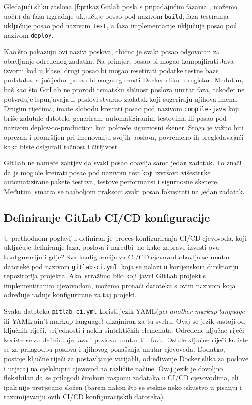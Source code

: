 \documentclass[a4paper,12pt,oneside]{article}
\begin{document}
Gledajući sliku zaslona \ref{f:prikaz Gitlab posla s pripadajućim fazama}, možemo uočiti da faza izgradnje uključuje posao pod nazivom \texttt{build}, faza testiranja uključuje posao pod nazivom \texttt{test}, a faza implementacije uključuje posao pod nazivom \texttt{deploy}.

Kao što pokazuju ovi nazivi poslova, obično je svaki posao odgovoran za obavljanje određenog zadatka. Na primjer, posao bi mogao kompajlirati Java izvorni kod u klase, drugi posao bi mogao resetirati podatke testne baze podataka, a još jedan posao bi mogao gurnuti Docker sliku u registar. Međutim, baš kao što GitLab ne provodi tematsku sličnost poslova unutar faza, također ne potvrđuje ispunjavaju li poslovi stvarno zadatak koji sugeriraju njihova imena. Drugim riječima, imate slobodu kreirati posao pod nazivom \texttt{compile-java} koji briše zalutale datoteke generirane automatiziranim testovima ili posao pod nazivom deploy-to-production koji pokreće sigurnosni skener. Stoga je važno biti oprezan i promišljen pri imenovanju svojih poslova, povremeno ih pregledavajući kako biste osigurali točnost i čitljivost.

GitLab ne nameće zahtjev da svaki posao obavlja samo jedan zadatak. To znači da je moguće kreirati posao pod nazivom test koji izvršava višestruke automatizirane pakete testova, testove performansi i sigurnosne skenere. Međutim, smatra se najboljom praksom svaki posao fokusirati na jedan zadatak.


\subsection{Definiranje GitLab CI/CD konfiguracije}

U prethodnom poglavlju definiran je proces konfiguriranja CI/CD cjevovoda, koji uključuje definiranje faza, poslova i naredbi, no kako zapravo izvesti ovu konfiguraciju i gdje? Sva konfiguracija za CI/CD cjevovod obavlja se unutar datoteke pod nazivom \texttt{gitlab-ci.yml}, koja se nalazi u korijenskom direktoriju repozitorija projekta. Ako istražimo bilo koji javni GitLab projekt s implementiranim cjevovodom, možemo pronaći datoteku s ovim nazivom koja određuje radnje konfigurirane za taj projekt.

Svaka datoteka \texttt{gitlab-ci.yml} koristi jezik YAML(\textit{yet another markup language} ili YAML ain't markup language) dizajniran za tu svrhu. Ovaj se jezik sastoji od ključnih riječi, vrijednosti i nekih sintaktičkih elemenata. Određene ključne riječi koriste se za definiranje faza i poslova unutar tih faza. Ostale ključne riječi koriste se za prilagodbu poslova i njihovog ponašanja unutar cjevovoda. Dodatno, postoje ključne riječi za postavljanje varijabli, određivanje Docker slika za poslove i utjecaj na cjelokupni cjevovod na različite načine. Ovaj jezik je dovoljno fleksibilan da se prilagodi širokom rasponu zadataka u CI/CD cjevovodima, ali ipak nije pretjerano složen (barem nakon što se stekne neko iskustvo u pisanju i razumijevanju ovih CI/CD konfiguracijskih datoteka).
\end{document}
